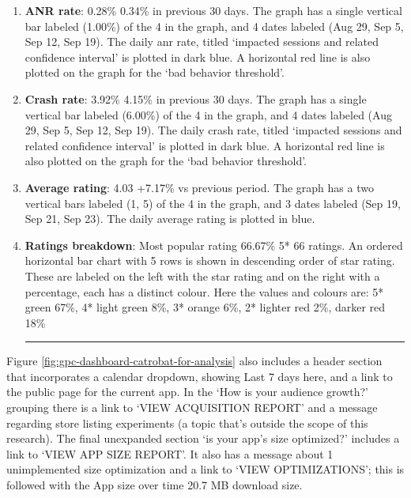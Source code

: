 \begin{enumerate}
    \vspace{0.1cm}
    \hrule
    \vspace{0.2cm}
    
    \item \textbf{ANR rate}: 0.28\% 0.34\% in previous 30 days. The graph has a single vertical bar labeled (1.00\%) of the 4 in the graph, and 4 dates labeled (Aug 29, Sep 5, Sep 12, Sep 19). The daily \gls{anr} rate, titled `impacted sessions and related confidence interval' is plotted in dark blue. A horizontal red line is also plotted on the graph for the `bad behavior threshold'.
    \item \textbf{Crash rate}: 3.92\% 4.15\% in previous 30 days. The graph has a single vertical bar labeled (6.00\%) of the 4 in the graph, and 4 dates labeled (Aug 29, Sep 5, Sep 12, Sep 19). The daily crash rate, titled `impacted sessions and related confidence interval' is plotted in dark blue. A horizontal red line is also plotted on the graph for the `bad behavior threshold'.

    \item \textbf{Average rating}: 4.03 +7.17\% vs previous period. The graph has a two vertical bars labeled (1, 5) of the 4 in the graph, and 3 dates labeled (Sep 19, Sep 21, Sep 23). The daily average rating is plotted in blue.
    \item \textbf{Ratings breakdown}: Most popular rating 66.67\% 5* 66 ratings. An ordered horizontal bar chart with 5 rows is shown in descending order of star rating. These are labeled on the left with the star rating and on the right with a percentage, each has a distinct colour. Here the values and colours are: 5* green 67\%, 4* light green 8\%, 3* orange 6\%, 2* lighter red 2\%, darker red 18\%
    
    \vspace{0.1cm}
    \hrule
    \vspace{0.2cm}
    
\end{enumerate}

Figure \ref{fig:gpc-dashboard-catrobat-for-analysis} also includes a header section that incorporates a calendar dropdown, showing Last 7 days here, and a link to the public page for the current app. In the `How is your audience growth?' grouping there is a link to `VIEW ACQUISITION REPORT' and a message regarding store listing experiments (a topic that's outside the scope of this research). The final unexpanded section `is your app's size optimized?' includes a link to `VIEW APP SIZE REPORT'. It also has a message about 1 unimplemented size optimization and a link to `VIEW OPTIMIZATIONS'; this is followed with the App size over time 20.7 MB download size.

